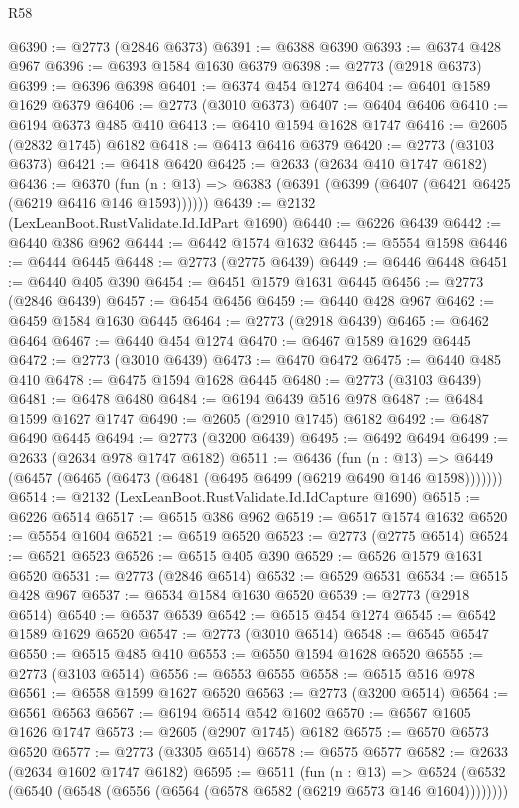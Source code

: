 \begin{lexlean}{R58}
\begin{coremodule}
@6390 := @2773 (@2846 @6373)
@6391 := @6388 @6390
@6393 := @6374 @428 @967
@6396 := @6393 @1584 @1630 @6379
@6398 := @2773 (@2918 @6373)
@6399 := @6396 @6398
@6401 := @6374 @454 @1274
@6404 := @6401 @1589 @1629 @6379
@6406 := @2773 (@3010 @6373)
@6407 := @6404 @6406
@6410 := @6194 @6373 @485 @410
@6413 := @6410 @1594 @1628 @1747
@6416 := @2605 (@2832 @1745) @6182
@6418 := @6413 @6416 @6379
@6420 := @2773 (@3103 @6373)
@6421 := @6418 @6420
@6425 := @2633 (@2634 @410 @1747 @6182)
@6436 := @6370
    (fun (n : @13) => @6383 (@6391 (@6399 (@6407 (@6421 @6425 (@6219 @6416 @146 @1593))))))
@6439 := @2132 (LexLeanBoot.RustValidate.Id.IdPart @1690)
@6440 := @6226 @6439
@6442 := @6440 @386 @962
@6444 := @6442 @1574 @1632
@6445 := @5554 @1598
@6446 := @6444 @6445
@6448 := @2773 (@2775 @6439)
@6449 := @6446 @6448
@6451 := @6440 @405 @390
@6454 := @6451 @1579 @1631 @6445
@6456 := @2773 (@2846 @6439)
@6457 := @6454 @6456
@6459 := @6440 @428 @967
@6462 := @6459 @1584 @1630 @6445
@6464 := @2773 (@2918 @6439)
@6465 := @6462 @6464
@6467 := @6440 @454 @1274
@6470 := @6467 @1589 @1629 @6445
@6472 := @2773 (@3010 @6439)
@6473 := @6470 @6472
@6475 := @6440 @485 @410
@6478 := @6475 @1594 @1628 @6445
@6480 := @2773 (@3103 @6439)
@6481 := @6478 @6480
@6484 := @6194 @6439 @516 @978
@6487 := @6484 @1599 @1627 @1747
@6490 := @2605 (@2910 @1745) @6182
@6492 := @6487 @6490 @6445
@6494 := @2773 (@3200 @6439)
@6495 := @6492 @6494
@6499 := @2633 (@2634 @978 @1747 @6182)
@6511 := @6436
    (fun (n : @13) => @6449 (@6457 (@6465 (@6473 (@6481 (@6495 @6499 (@6219 @6490 @146 @1598)))))))
@6514 := @2132 (LexLeanBoot.RustValidate.Id.IdCapture @1690)
@6515 := @6226 @6514
@6517 := @6515 @386 @962
@6519 := @6517 @1574 @1632
@6520 := @5554 @1604
@6521 := @6519 @6520
@6523 := @2773 (@2775 @6514)
@6524 := @6521 @6523
@6526 := @6515 @405 @390
@6529 := @6526 @1579 @1631 @6520
@6531 := @2773 (@2846 @6514)
@6532 := @6529 @6531
@6534 := @6515 @428 @967
@6537 := @6534 @1584 @1630 @6520
@6539 := @2773 (@2918 @6514)
@6540 := @6537 @6539
@6542 := @6515 @454 @1274
@6545 := @6542 @1589 @1629 @6520
@6547 := @2773 (@3010 @6514)
@6548 := @6545 @6547
@6550 := @6515 @485 @410
@6553 := @6550 @1594 @1628 @6520
@6555 := @2773 (@3103 @6514)
@6556 := @6553 @6555
@6558 := @6515 @516 @978
@6561 := @6558 @1599 @1627 @6520
@6563 := @2773 (@3200 @6514)
@6564 := @6561 @6563
@6567 := @6194 @6514 @542 @1602
@6570 := @6567 @1605 @1626 @1747
@6573 := @2605 (@2907 @1745) @6182
@6575 := @6570 @6573 @6520
@6577 := @2773 (@3305 @6514)
@6578 := @6575 @6577
@6582 := @2633 (@2634 @1602 @1747 @6182)
@6595 := @6511
    (fun (n : @13) =>
    @6524 (@6532 (@6540 (@6548 (@6556 (@6564 (@6578 @6582 (@6219 @6573 @146 @1604))))))))

\end{coremodule}
\end{lexlean}
